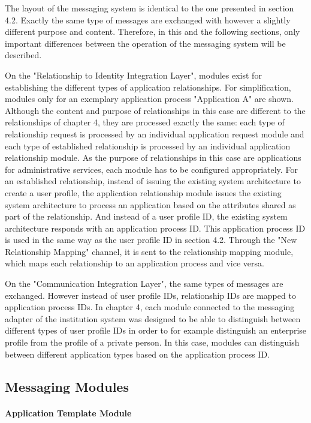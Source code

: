The layout of the messaging system is identical to the one presented in section 4.2. Exactly the same type of messages are exchanged with however a slightly different purpose and content. Therefore, in this and the following sections, only important differences between the operation of the messaging system will be described.

On the "Relationship to Identity Integration Layer", modules exist for establishing the different types of application relationships. For simplification, modules only for an exemplary application process "Application A" are shown. Although the content and purpose of relationships in this case are different to the relationships of chapter 4, they are processed exactly the same: each type of relationship request is processed by an individual application request module and each type of established relationship is processed by an individual application relationship module. As the purpose of relationships in this case are applications for administrative services, each module has to be configured appropriately. For an established relationship, instead of issuing the existing system architecture to create a user profile, the application relationship module issues the existing system architecture to process an application based on the attributes shared as part of the relationship. And instead of a user profile ID, the existing system architecture responds with an application process ID. This application process ID is used in the same way as the user profile ID in section 4.2. Through the "New Relationship Mapping" channel, it is sent to the relationship mapping module, which maps each relationship to an application process and vice versa.

On the "Communication Integration Layer", the same types of messages are exchanged. However instead of user profile IDs, relationship IDs are mapped to application process IDs. In chapter 4, each module connected to the messaging adapter of the institution system was designed to be able to distinguish between different types of user profile IDs in order to for example distinguish an enterprise profile from the profile of a private person. In this case, modules can distinguish between different application types based on the application process ID.

\subsection{Messaging Modules}

\paragraph{Application Template Module}

